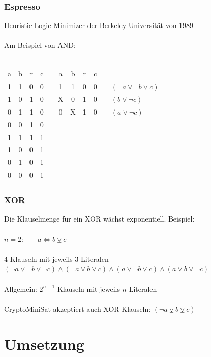 \documentclass{beamer}
\begin{document}
    \begin{frame}
      \frametitle{Espresso}
      Heuristic Logic Minimizer der Berkeley Universität von 1989\\
      ~\\
      Am Beispiel von AND:\\
      ~\\
      \begin{tabular}{ccc|cp{1cm}ccc|cp{1cm}l}
        a & b & r & c & & a & b & r & c\\
        \cline{1-4}\cline{6-9}
        1 & 1 & 0 & 0 & & 1 & 1 & 0 & 0 & & $ (\neg a \vee \neg b \vee c) $\\
        1 & 0 & 1 & 0 & & X & 0 & 1 & 0 & & $ (b \vee \neg c) $\\
        0 & 1 & 1 & 0 & & 0 & X & 1 & 0 & & $ (a \vee \neg c) $\\
        0 & 0 & 1 & 0 \\
        \cline{1-4}
        1 & 1 & 1 & 1 \\
        1 & 0 & 0 & 1 \\
        0 & 1 & 0 & 1 \\
        0 & 0 & 0 & 1 \\
      \end{tabular}
    \end{frame}
    \begin{frame}
      \frametitle{XOR}
      Die Klauselmenge für ein XOR wächst exponentiell. Beispiel:\\
      ~\\
      $n = 2$:~~~~$ a \Leftrightarrow b \veebar c$\\
      ~\\
      4 Klauseln mit jeweils 3 Literalen
      ~\\
      $ (\neg a \vee \neg b \vee \neg c) \wedge (\neg a \vee b \vee c) \wedge (a \vee \neg b \vee c) \wedge (a \vee b \vee \neg c) $\\
      ~\\
      Allgemein: $ 2^{n - 1} $ Klauseln mit jeweils $ n $ Literalen\\
      ~\\
      CryptoMiniSat akzeptiert auch XOR-Klauseln: $ (\neg a \veebar b \veebar c)$\\
    \end{frame}

\section{Umsetzung}
\end{document}
